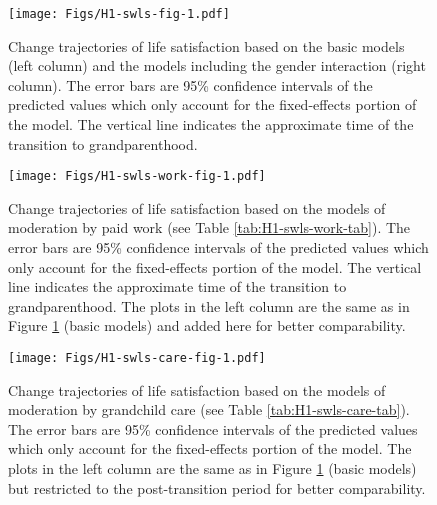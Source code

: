 \documentclass[
  english,
  man, noextraspace]{apa7}
\begin{document}
\begin{appendix}
\begin{figure}
\centering
\texttt{[image: Figs/H1-swls-fig-1.pdf]}
\caption{\label{fig:H1-swls-fig}Change trajectories of life satisfaction based on
the basic models (left column) and the models including the gender
interaction (right column). The error bars are 95\% confidence intervals
of the predicted values which only account for the fixed-effects portion
of the model. The vertical line indicates the approximate time of the
transition to grandparenthood.}
\end{figure}










\begin{figure}
\centering
\texttt{[image: Figs/H1-swls-work-fig-1.pdf]}
\caption{\label{fig:H1-swls-work-fig}Change trajectories of life satisfaction
based on the models of moderation by paid work (see Table
\ref{tab:H1-swls-work-tab}). The error bars are 95\% confidence
intervals of the predicted values which only account for the
fixed-effects portion of the model. The vertical line indicates the
approximate time of the transition to grandparenthood. The plots in the
left column are the same as in Figure \ref{fig:H1-swls-fig} (basic
models) and added here for better comparability.}
\end{figure}









\begin{figure}
\centering
\texttt{[image: Figs/H1-swls-care-fig-1.pdf]}
\caption{\label{fig:H1-swls-care-fig}Change trajectories of life satisfaction
based on the models of moderation by grandchild care (see Table
\ref{tab:H1-swls-care-tab}). The error bars are 95\% confidence
intervals of the predicted values which only account for the
fixed-effects portion of the model. The plots in the left column are the
same as in Figure \ref{fig:H1-swls-fig} (basic models) but restricted to
the post-transition period for better comparability.}
\end{figure}













\end{appendix}
\end{document}
